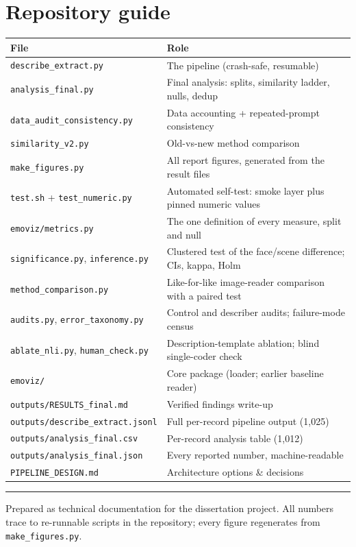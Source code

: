 \documentclass[11pt,a4paper]{article}
\begin{document}
\section{Repository guide}
\begin{center}
\begin{tabular}{@{}p{5.6cm}p{8.6cm}@{}}
\toprule
\textbf{File} & \textbf{Role}\\
\midrule
\texttt{describe\_extract.py} & The pipeline (crash-safe, resumable)\\
\texttt{analysis\_final.py} & Final analysis: splits, similarity ladder, nulls, dedup\\
\texttt{data\_audit\_consistency.py} & Data accounting + repeated-prompt consistency\\
\texttt{similarity\_v2.py} & Old-vs-new method comparison\\
\texttt{make\_figures.py} & All report figures, generated from the result files\\
\texttt{test.sh} + \texttt{test\_numeric.py} & Automated self-test: smoke layer plus pinned numeric values\\
\texttt{emoviz/metrics.py} & The one definition of every measure, split and null\\
\texttt{significance.py}, \texttt{inference.py} & Clustered test of the face/scene difference; CIs, kappa, Holm\\
\texttt{method\_comparison.py} & Like-for-like image-reader comparison with a paired test\\
\texttt{audits.py}, \texttt{error\_taxonomy.py} & Control and describer audits; failure-mode census\\
\texttt{ablate\_nli.py}, \texttt{human\_check.py} & Description-template ablation; blind single-coder check\\
\texttt{emoviz/} & Core package (loader; earlier baseline reader)\\
\texttt{outputs/RESULTS\_final.md} & Verified findings write-up\\
\texttt{outputs/describe\_extract.jsonl} & Full per-record pipeline output (1{,}025)\\
\texttt{outputs/analysis\_final.csv} & Per-record analysis table (1{,}012)\\
\texttt{outputs/analysis\_final.json} & Every reported number, machine-readable\\
\texttt{PIPELINE\_DESIGN.md} & Architecture options \& decisions\\
\bottomrule
\end{tabular}
\end{center}

\vspace{8pt}
\hrule
\vspace{6pt}
{\small\color{soft} Prepared as technical documentation for the dissertation project. All numbers
trace to re-runnable scripts in the repository; every figure regenerates from
\texttt{make\_figures.py}.}
\end{document}
